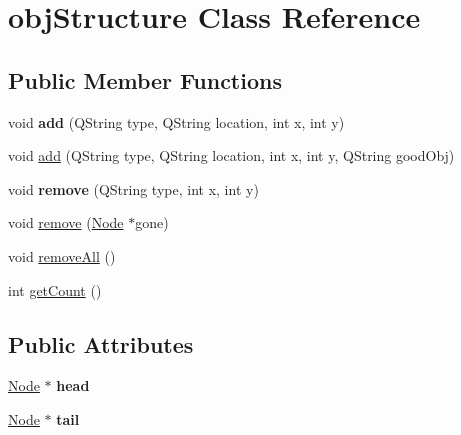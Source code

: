 \hypertarget{classobj_structure}{\section{obj\-Structure Class Reference}
\label{classobj_structure}
}
\subsection*{Public Member Functions}
\begin{DoxyCompactItemize}
\item 
\hypertarget{classobj_structure_a471be95d137c9d40b45e49be917f3933}{void {\bfseries add} (Q\-String type, Q\-String location, int x, int y)}\label{classobj_structure_a471be95d137c9d40b45e49be917f3933}

\item 
void \hyperlink{classobj_structure_a4bfcab0d9931a486b303a8be4d7f380a}{add} (Q\-String type, Q\-String location, int x, int y, Q\-String good\-Obj)
\item 
\hypertarget{classobj_structure_ad8ee59f0e4377ee81469edca96b6a623}{void {\bfseries remove} (Q\-String type, int x, int y)}\label{classobj_structure_ad8ee59f0e4377ee81469edca96b6a623}

\item 
void \hyperlink{classobj_structure_a6efb04e79b755dffa27d22a48e51140d}{remove} (\hyperlink{class_node}{Node} $\ast$gone)
\item 
void \hyperlink{classobj_structure_a41750e7cf482a5831d63b4bc0e494101}{remove\-All} ()
\item 
int \hyperlink{classobj_structure_aa7c8aff07ac4acf636029ea3fd9a427b}{get\-Count} ()
\end{DoxyCompactItemize}
\subsection*{Public Attributes}
\begin{DoxyCompactItemize}
\item 
\hypertarget{classobj_structure_aa7c0d7034f8597701ea1317bd6e144b1}{\hyperlink{class_node}{Node} $\ast$ {\bfseries head}}\label{classobj_structure_aa7c0d7034f8597701ea1317bd6e144b1}

\item 
\hypertarget{classobj_structure_ad49ade870fa2a6c48a1f875e9ecbb63b}{\hyperlink{class_node}{Node} $\ast$ {\bfseries tail}}\label{classobj_structure_ad49ade870fa2a6c48a1f875e9ecbb63b}

\end{DoxyCompactItemize}


